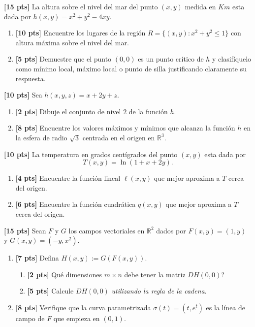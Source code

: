 \documentclass[12pt]{article}
\newcommand{\RR}{\mathbb{R}}
\begin{document}
\begin{enumerate}

\item{{\bf [15 pts]} La altura sobre el nivel del mar del punto $(x,y)$ medida en $Km$ esta dada por $h(x,y)=x^2+y^2-4xy$. 
\begin{enumerate}
\item  {\bf [10 pts]} Encuentre los lugares de la regi\'on $R=\{(x,y): x^2+y^2\leq 1\}$ con altura m\'axima sobre el nivel del mar.
\item {\bf [5 pts]} Demuestre que el punto $(0,0)$ es un punto cr\'itico de $h$ y clasif\'iquelo como m\'inimo local, m\'aximo local o punto de silla justificando claramente su respuesta.

\end{enumerate}
\newpage

\item {\bf [10 pts]} Sea $h(x,y,z)=x+2y+z$.

\begin{enumerate}
\item {\bf [2 pts]} Dibuje el conjunto de nivel $2$ de la funci\'on $h$.
\item {\bf [8 pts]} Encuentre los valores m\'aximos y m\'inimos que alcanza la funci\'on $h$ en la esfera de radio $\sqrt{3}$ centrada en el origen en $\RR^3$. 
\end{enumerate}

\newpage

\item {\bf [10 pts]} La temperatura en grados cent\'igrados del punto $(x,y)$ esta dada por \[T(x,y)=\ln(1+x+2y).\]
\begin{enumerate}
\item {[\bf 4 pts]} Encuentre la funci\'on lineal $\ell(x,y)$ que mejor aproxima a $T$ cerca del origen.
\item {[\bf 6 pts]} Encuentre la funci\'on cuadr\'atica $q(x,y)$ que mejor aproxima a $T$ cerca del origen.
\end{enumerate}
\newpage

\item {\bf [15 pts]} Sean $F$ y $G$ los campos vectoriales en $\RR^2$ dados por $F(x,y)=(1,y)$ y $G(x,y)=(-y,x^2)$.  
\begin{enumerate}
\item {\bf [7 pts]} Defina $H(x,y):=G(F(x,y))$.
\begin{enumerate}
\item {\bf [2 pts]} Qu\'e dimensiones $m\times n$ debe tener la matriz $DH(0,0)$?
\item {\bf [5 pts]} Calcule $DH(0,0)$ {\it utilizando la regla de la cadena}.
\end{enumerate}
\item {\bf [8 pts]} Verifique que la curva parametrizada $\sigma(t)=(t,e^t)$ es la l\'inea de campo de $F$ que empieza en $(0,1)$.
\end{enumerate}
}
\end{enumerate}
\end{document}
